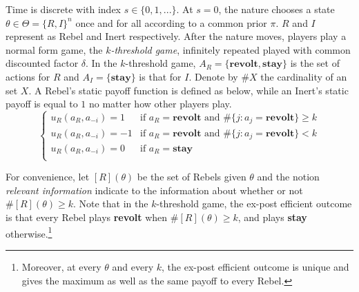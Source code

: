\documentclass[12pt,letter]{article}
\theoremstyle{definition}
\theoremstyle{remark}
\theoremstyle{claim}
\begin{document}
Time is discrete with index $s\in\{0,1,...\}$. At $s=0$, the nature chooses a state $\theta\in \Theta=\{R,I\}^n$ once and for all according to a common prior $\pi$. $R$ and $I$ represent as Rebel and Inert respectively. After the nature moves, players play a normal form game, the \textit{$k$-threshold game}, infinitely repeated played with common discounted factor $\delta$. In the $k$-threshold game, $A_R=\{\textbf{revolt}, \textbf{stay}\}$ is the set of actions for $R$ and $A_I=\{\textbf{stay}\}$ is that for $I$. Denote by $\#X$ the cardinality of an set $X$. A Rebel's static payoff function is defined as below, while an Inert's static payoff is equal to $1$ no matter how other players play. 
\[   \left\{
\begin{array}{ll}
      u_{R}(a_{R},a_{-i})=1 & \text{if $a_{R}=\textbf{revolt}$ and $\#\{j:a_{j}=\textbf{revolt}\}\geq k$} \\
      u_{R}(a_{R},a_{-i})=-1 & \text{if $a_{R}=\textbf{revolt}$ and $\#\{j:a_{j}=\textbf{revolt}\}< k$} \\
      u_{R}(a_{R},a_{-i})=0 & \text{if $a_{R}=\textbf{stay}$} \\
\end{array} 
\right. \]


For convenience, let $[R](\theta)$ be the set of Rebels given $\theta$ and the notion \textit{relevant information} indicate to the information about whether or not $\#[R](\theta)\geq k$. Note that in the $k$-threshold game, the ex-post efficient outcome is that every Rebel plays \textbf{revolt} when $\#[R](\theta)\geq k$, and plays \textbf{stay} otherwise.\footnote{Moreover, at every $\theta$ and every $k$, the ex-post efficient outcome is unique and gives the maximum as well as the same payoff to every Rebel.} 
\end{document}
